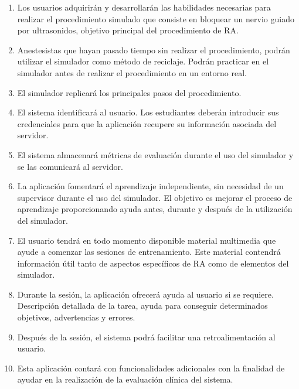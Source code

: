 \begin{enumerate}
    \item Los usuarios adquirirán y desarrollarán las habilidades necesarias para realizar el procedimiento simulado que consiste en bloquear un nervio guiado por ultrasonidos, objetivo principal del procedimiento de \ac{RA}.
\item Anestesistas que hayan pasado tiempo sin realizar el procedimiento, podrán utilizar el simulador como método de reciclaje. Podrán practicar en el simulador antes de realizar el procedimiento en un entorno real. 
\item El simulador replicará los principales pasos del procedimiento.
\item El sistema identificará al usuario. Los estudiantes deberán introducir sus credenciales para que la aplicación recupere su información asociada del servidor.
\item  El sistema almacenará métricas de evaluación durante el uso del simulador y se las comunicará al servidor.
\item  La aplicación fomentará el aprendizaje independiente, sin necesidad de un supervisor durante el uso del simulador. El objetivo es mejorar el proceso de aprendizaje proporcionando ayuda antes, durante y después de la utilización del simulador. 

\item El usuario tendrá en todo momento disponible material multimedia que ayude a comenzar las sesiones de entrenamiento. Este material contendrá información útil tanto de aspectos específicos de \ac{RA} como de elementos del simulador.
\item Durante la sesión, la aplicación ofrecerá ayuda al usuario si se requiere. Descripción detallada de la tarea, ayuda para conseguir determinados objetivos, advertencias y errores.
\item Después de la sesión, el sistema podrá facilitar una retroalimentación al usuario.
\item Esta aplicación contará con funcionalidades adicionales con la finalidad de ayudar en la realización de la evaluación clínica del sistema.
\end{enumerate}





